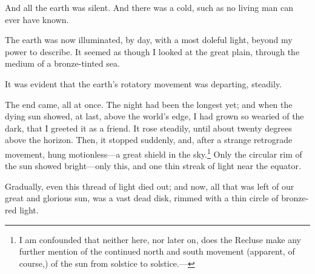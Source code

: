 And all the earth was silent. And there was a cold, such as no living man can ever have known.

The earth was now illuminated, by day, with a most doleful light, beyond my power to describe. It seemed as though I looked at the great plain, through the medium of a bronze-tinted sea.

It was evident that the earth’s rotatory movement was departing, steadily.

The end came, all at once. The night had been the longest yet; and when the dying sun showed, at last, above the world’s edge, I had grown so wearied of the dark, that I greeted it as a friend. It rose steadily, until about twenty degrees above the horizon. Then, it stopped suddenly, and, after a strange retrograde movement, hung motionless---a great shield in the sky.\footnote{I am confounded that neither here, nor later on, does the Recluse make any further mention of the continued north and south movement (apparent, of course,) of the sun from solstice to solstice.---} Only the circular rim of the sun showed bright---only this, and one thin streak of light near the equator.

Gradually, even this thread of light died out; and now, all that was left of our great and glorious sun, was a vast dead disk, rimmed with a thin circle of bronze-red light.

\clearpage

